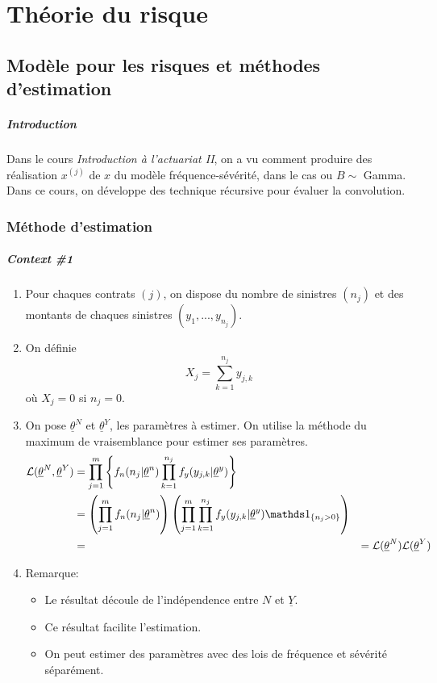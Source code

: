 \chapter{Théorie du risque}


\section{Modèle pour les risques et méthodes d'estimation}
\paragraph{Introduction} 
Dans le cours \emph{Introduction à l'actuariat II}, on a vu comment produire des réalisation $x^{(j)}$ de $x$ du modèle fréquence-sévérité, dans le cas ou $B\sim$ Gamma. Dans ce cours, on développe des technique récursive pour évaluer la convolution.

\subsection{Méthode d'estimation}

\paragraph{Context \#1}
\begin{enumerate}[label=(\arabic*)]
    \item Pour chaques contrats $(j)$, on dispose du nombre de sinistres $(n_j)$ et des montants de chaques sinistres $(y_1,...,y_{n_j})$.
    \item On définie \[ X_j = \sum_{k=1}^{n_j} y_{j,k} \] où $X_j = 0$ si $n_j = 0$.
    \item On pose $\underline{\theta}^N$ et $\underline{\theta}^Y$, les paramètres à estimer. On utilise la méthode du maximum de vraisemblance pour estimer ses paramètres. 
        \begin{align*}
            \mathcal{L}(\underline{\theta}^N,\underline{\theta}^Y) &= \prod_{j=1}^m \left\{ f_n(n_j|\underline{\theta}^n) \prod_{k=1}^{n_j} f_y(y_{j,k}|\underline{\theta}^y) \right\} \\
            &= \left( \prod_{j=1}^m f_n(n_j|\underline{\theta}^n) \right) \left( \prod_{j=1}^m \prod_{k=1}^{n_j} f_y(y_{j,k}|\underline{\theta}^y) \indic{n_j>0} \right) \\
            &= 
            &= \mathcal{L}(\underline{\theta}^N)\mathcal{L}(\underline{\theta}^Y)
        \end{align*}
    \item Remarque:
    \begin{itemize}
        \item Le résultat découle de l'indépendence entre $N$ et $\underline{Y}$.
        \item Ce résultat facilite l'estimation.
        \item On peut estimer des paramètres avec des lois de fréquence et sévérité séparément.
    \end{itemize}
\end{enumerate}

